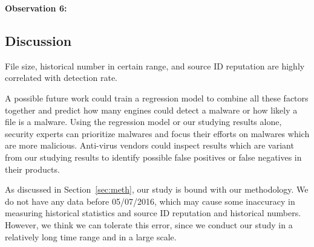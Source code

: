 {\bf Observation 6:} 
{\em }

\subsection{Discussion}

File size, historical number in certain range, and source ID reputation
are highly correlated with detection rate. 

A possible future work could train a regression model to combine all these factors together and 
predict how many engines could detect a malware or how likely a file is a malware. 
Using the regression model or our studying results alone, 
security experts can prioritize malwares and focus their efforts on malwares which are more malicious. 
Anti-virus vendors could inspect results which are variant from our studying results 
to identify possible false positives or false negatives in their products. 

As discussed in Section~\ref{sec:meth}, our study is bound with our methodology.
We do not have any data before 05/07/2016, 
which may cause some inaccuracy in measuring historical statistics and 
source ID reputation and historical numbers.
However, we think we can tolerate this error, 
since we conduct our study in a relatively long time range and in a large scale. 
